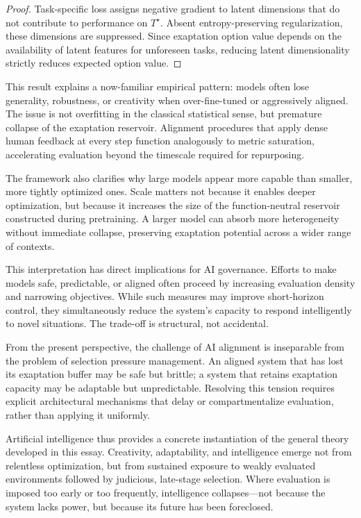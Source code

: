 \documentclass[11pt]{article}
\theoremstyle{definition}
\begin{document}
\begin{proof}
Task-specific loss assigns negative gradient to latent dimensions that do not contribute to performance on $T^\star$. Absent entropy-preserving regularization, these dimensions are suppressed. Since exaptation option value depends on the availability of latent features for unforeseen tasks, reducing latent dimensionality strictly reduces expected option value.
\end{proof}

This result explains a now-familiar empirical pattern: models often lose generality, robustness, or creativity when over-fine-tuned or aggressively aligned. The issue is not overfitting in the classical statistical sense, but premature collapse of the exaptation reservoir. Alignment procedures that apply dense human feedback at every step function analogously to metric saturation, accelerating evaluation beyond the timescale required for repurposing.

The framework also clarifies why large models appear more capable than smaller, more tightly optimized ones. Scale matters not because it enables deeper optimization, but because it increases the size of the function-neutral reservoir constructed during pretraining. A larger model can absorb more heterogeneity without immediate collapse, preserving exaptation potential across a wider range of contexts.

This interpretation has direct implications for AI governance. Efforts to make models safe, predictable, or aligned often proceed by increasing evaluation density and narrowing objectives. While such measures may improve short-horizon control, they simultaneously reduce the system’s capacity to respond intelligently to novel situations. The trade-off is structural, not accidental.

From the present perspective, the challenge of AI alignment is inseparable from the problem of selection pressure management. An aligned system that has lost its exaptation buffer may be safe but brittle; a system that retains exaptation capacity may be adaptable but unpredictable. Resolving this tension requires explicit architectural mechanisms that delay or compartmentalize evaluation, rather than applying it uniformly.

Artificial intelligence thus provides a concrete instantiation of the general theory developed in this essay. Creativity, adaptability, and intelligence emerge not from relentless optimization, but from sustained exposure to weakly evaluated environments followed by judicious, late-stage selection. Where evaluation is imposed too early or too frequently, intelligence collapses—not because the system lacks power, but because its future has been foreclosed.
\end{document}
